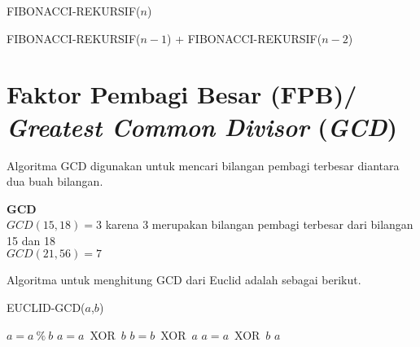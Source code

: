 \begin{algorithm}[H]
	\caption{FIBONACCI-REKURSIF($n$)}
	\label{algo:fiboRekursif}
	\begin{algorithmic}[1]
		\ELSE
			\RETURN FIBONACCI-REKURSIF($n-1$) + FIBONACCI-REKURSIF($n-2$)
		\ENDIF
	\end{algorithmic}
\end{algorithm}




\section{Faktor Pembagi Besar (FPB)/ \textit{Greatest Common Divisor} (\textit{GCD}) }
Algoritma GCD digunakan untuk mencari bilangan pembagi terbesar diantara dua buah bilangan. 
\begin{contoh}
	\textbf{GCD}\\
		$GCD(15,18) = 3$ karena 3 merupakan bilangan pembagi terbesar dari bilangan 15 dan 18\\
		$GCD(21,56) = 7$
\end{contoh}

Algoritma untuk menghitung GCD dari Euclid adalah sebagai berikut.
\begin{algorithm}[H]
	\caption{EUCLID-GCD($a$,$b$)}
	\begin{algorithmic}[1]
			\STATE $a=a\ \%\ b$
			\STATE $a=a$\ XOR\ $b$
			\STATE $b=b$\ XOR\ $a$
			\STATE $a=a$\ XOR\ $b$
		\ENDWHILE
		\RETURN $a$
	\end{algorithmic}
\end{algorithm}




